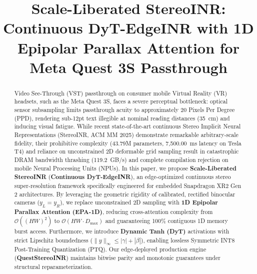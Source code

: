 \documentclass[conference]{IEEEtran}
\begin{document}
\title{Scale-Liberated StereoINR: Continuous DyT-EdgeINR with 1D Epipolar Parallax Attention for Meta Quest 3S Passthrough}

\author{
}

\maketitle

\begin{abstract}
Video See-Through (VST) passthrough on consumer mobile Virtual Reality (VR) headsets, such as the Meta Quest 3S, faces a severe perceptual bottleneck: optical sensor subsampling limits passthrough acuity to approximately 20 Pixels Per Degree (PPD), rendering sub-12pt text illegible at nominal reading distances (35~cm) and inducing visual fatigue. While recent state-of-the-art continuous Stereo Implicit Neural Representations (StereoINR, ACM MM 2025) demonstrate remarkable arbitrary-scale fidelity, their prohibitive complexity (43.79M parameters, 7,500.00~ms latency on Tesla T4) and reliance on unconstrained 2D deformable grid sampling result in catastrophic DRAM bandwidth thrashing (119.2~GB/s) and complete compilation rejection on mobile Neural Processing Units (NPUs).
In this paper, we propose \textbf{Scale-Liberated StereoINR} (\textbf{Continuous DyT-EdgeINR}), an edge-optimized continuous stereo super-resolution framework specifically engineered for embedded Snapdragon XR2 Gen 2 architectures. By leveraging the geometric rigidity of calibrated, rectified binocular cameras ($y_L = y_R$), we replace unconstrained 2D sampling with \textbf{1D Epipolar Parallax Attention (EPA-1D)}, reducing cross-attention complexity from $\mathcal{O}((HW)^2)$ to $\mathcal{O}(HW \cdot D_{\max})$ and guaranteeing 100\% contiguous 1D memory burst access. Furthermore, we introduce \textbf{Dynamic Tanh (DyT)} activations with strict Lipschitz boundedness ($\|y\|_\infty \le |\gamma| + |\beta|$), enabling lossless Symmetric INT8 Post-Training Quantization (PTQ). Our edge-deployed production engine (\textbf{QuestStereoINR}) maintains bitwise parity and monotonic guarantees under structural reparameterization.

\end{abstract}
\end{document}
